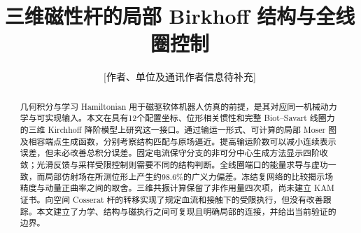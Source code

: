 \documentclass[Afour,sageh,times]{sagej}
\title{三维磁性杆的局部 Birkhoff 结构与全线圈控制}
\author{[作者、单位及通讯作者信息待补充]}
\begin{document}
\begin{abstract}
几何积分与学习 Hamiltonian 用于磁驱软体机器人仿真的前提，是其对应同一机械动力学与可实现输入。本文在具有12个配置坐标、位形相关惯性和完整 Biot--Savart 线圈力的三维 Kirchhoff 降阶模型上研究这一接口。通过输运一形式、可计算的局部 Moser 图及相容端点生成函数，分别考察结构匹配与原场逼近。提高输运阶数可以减小连续表示误差，但未必改善总积分误差。固定电流保守分支的非可分中心生成方法显示四阶收敛；光滑反馈与采样受限控制则需要不同的结构判断。全线圈端口的能量求导与虚功一致，而局部仿射场在所测位形上产生约98.6\%的广义力偏差。冻结复网络的比较揭示场精度与动量正曲率之间的取舍。三维共振计算保留了非作用量四次项，尚未建立 KAM 证书。向空间 Cosserat 杆的转移实现了规定血流和接触下的受限执行，但没有改善跟踪。本文建立了力学、结构与磁执行之间可复现且明确局部的连接，并给出当前验证的边界。
\end{abstract}
\maketitle









\end{document}
